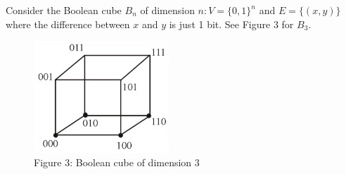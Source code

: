\begin{problem}[30 points] Consider the Boolean cube $B_n$ of dimension $n: V=\{0,1\}^n$ and $E=\{(x,y)\}$ where the difference between $x$ and $y$ is just 1 bit. See Figure 3 for $B_3$.
\end{problem}
\begin{figure}[H]
	\centering
	\includegraphics[width=2in]{images/p2.png}\\
	Figure 3: Boolean cube of dimension 3
\end{figure} 
